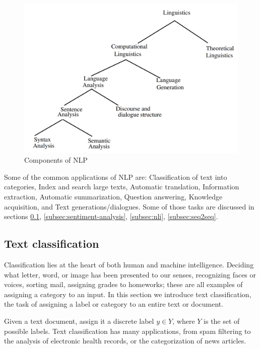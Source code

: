 \begin{figure}[H]
    \centering
    \includegraphics[width=\textwidth]{images/2_1_nlp_components.png}
    \caption{Components of NLP}\label{fig:nlp_components}
\end{figure}
    


Some of the common applications of NLP are: Classification of text into categories, Index and search large texts, Automatic translation, Information extraction,
Automatic summarization, Question answering, Knowledge acquisition, and Text
generations/dialogues.
Some of those tasks are discussed in sections \ref{subsec:text-classification}, \ref{subsec:sentiment-analysis}, \ref{subsec:nli}, \ref{subsec:seq2seq}.


\subsection{Text classification}\label{subsec:text-classification}

Classification lies at the heart of both human and machine intelligence. Deciding what letter, word, or image has been presented to our senses, recognizing faces or voices, sorting mail, assigning grades to homeworks; these are all examples of assigning a category to an input.
In this section we introduce text classification, the task of assigning a label or category to an entire text or document.

Given a text document, assign it a discrete label $y \in Y$, where $Y$ is the set of possible labels. 
Text classification has many applications, from spam filtering to the analysis of electronic health records, or the categorization of news articles.


